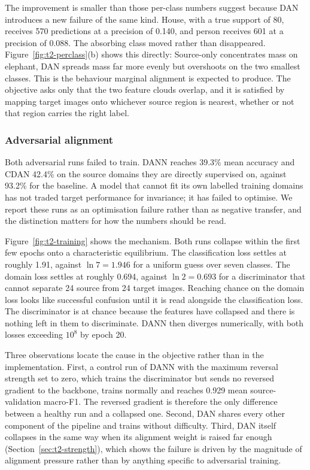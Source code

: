 The improvement is smaller than those per-class numbers suggest because DAN
introduces a new failure of the same kind. House, with a true support of 80,
receives 570 predictions at a precision of 0.140, and person receives 601 at a
precision of 0.088. The absorbing class moved rather than disappeared.
Figure~\ref{fig:t2-perclass}(b) shows this directly: Source-only concentrates
mass on elephant, DAN spreads mass far more evenly but overshoots on the two
smallest classes. This is the behaviour marginal alignment is expected to produce.
The objective asks only that the two feature clouds overlap, and it is satisfied
by mapping target images onto whichever source region is nearest, whether or not
that region carries the right label.

\subsubsection{Adversarial alignment}

Both adversarial runs failed to train. DANN reaches 39.3\% mean accuracy and
CDAN 42.4\% on the source domains they are directly supervised on, against 93.2\%
for the baseline. A model that cannot fit its own labelled training domains has
not traded target performance for invariance; it has failed to optimise. We
report these runs as an optimisation failure rather than as negative transfer,
and the distinction matters for how the numbers should be read.

Figure~\ref{fig:t2-training} shows the mechanism. Both runs collapse within the
first few epochs onto a characteristic equilibrium. The classification loss
settles at roughly 1.91, against $\ln 7 = 1.946$ for a uniform guess over seven
classes. The domain loss settles at roughly 0.694, against $\ln 2 = 0.693$ for a
discriminator that cannot separate 24 source from 24 target images. Reaching chance on the domain loss looks like successful
confusion until it is read alongside the classification loss. The discriminator
is at chance because the features have collapsed and there is nothing left in
them to discriminate. DANN then diverges numerically, with both losses exceeding
$10^{8}$ by epoch 20.

Three observations locate the cause in the objective rather than in the
implementation. First, a control run of DANN with the maximum reversal strength
set to zero, which trains the discriminator but sends no reversed gradient to the
backbone, trains normally and reaches 0.929 mean source-validation macro-F1. The
reversed gradient is therefore the only difference between a healthy run and a
collapsed one. Second, DAN shares every other component of the pipeline and
trains without difficulty. Third, DAN itself collapses in the same way when its
alignment weight is raised far enough (Section~\ref{sec:t2-strength}), which
shows the failure is driven by the magnitude of alignment pressure rather than by
anything specific to adversarial training.

